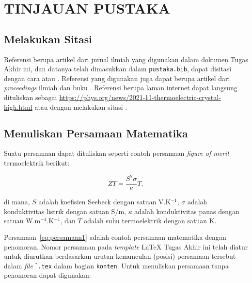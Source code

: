 \renewcommand{\thechapter}{\Roman{chapter}}
\chapter{TINJAUAN PUSTAKA}
\renewcommand{\thechapter}{\arabic{chapter}}

\section{Melakukan Sitasi }

Referensi berupa artikel dari jurnal ilmiah yang digunakan dalam dokumen Tugas Akhir ini, dan datanya telah dimasukkan dalam \texttt{pustaka.bib}, dapat disitasi dengan cara \citet{refJurnal} atau \citep{refJurnal}. Referensi yang digunakan juga dapat berupa artikel dari \textit{proceedings} ilmiah dan buku \citep{refProceedings,refBuku}. Referensi berupa laman internet dapat langsung dituliskan sebagai \url{https://phys.org/news/2021-11-thermoelectric-crystal-high.html} atau dengan melakukan sitasi \citep{refInternet}.

\section{Menuliskan Persamaan Matematika}

Suatu persamaan dapat dituliskan seperti contoh persamaan \textit{figure of merit} termoelektrik berikut:

\begin{equation}
    ZT = \dfrac{S^2 \sigma}{\kappa} T,
    \label{eq:persamaan1}
\end{equation}

\noindent di mana, $S$ adalah koefisien Seebeck dengan satuan V.K$^{-1}$, $\sigma$ adalah konduktivitas listrik dengan satuan S/m, $\kappa$ adalah konduktivitas panas dengan satuan W.m$^{-1}$.K$^{-1}$, dan $T$ adalah suhu termoelektrik dengan satuan K. 

Persamaan~\ref{eq:persamaan1} adalah contoh persamaan matematika dengan penomoran. Nomor persamaan pada \textit{template} \LaTeX{} Tugas Akhir ini telah diatur untuk diurutkan berdasarkan urutan kemunculan (posisi) persamaan tersebut dalam \textit{file} \texttt{$^*$.tex} dalam bagian \texttt{konten}. Untuk menuliskan persamaan tanpa penomoran dapat digunakan:


